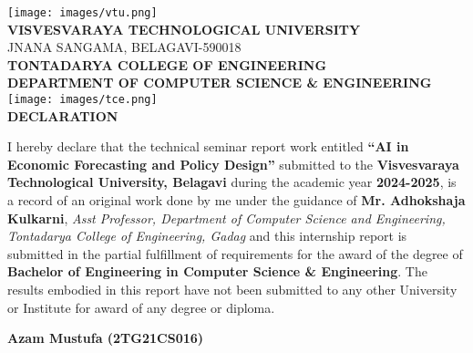 \begin{titlepage}
    \thispagestyle{empty}
    \centering

    \texttt{[image: images/vtu.png]}\\[0.3cm]

    {\LARGE\bfseries{VISVESVARAYA TECHNOLOGICAL UNIVERSITY}}\\[0.2cm]
    {\large{JNANA SANGAMA, BELAGAVI-590018}}\\[0.3cm]

    {\Large\bfseries{TONTADARYA COLLEGE OF ENGINEERING}}\\[0.15cm]
    {\large\bfseries{DEPARTMENT OF COMPUTER SCIENCE \& ENGINEERING}}\\[0.8cm]

    \texttt{[image: images/tce.png]}\\[0.8cm] %

    {\Large\bfseries{DECLARATION}}\\[0.8cm]

    \begin{flushleft}
        \setlength{\parindent}{0pt}
        \renewcommand{\baselinestretch}{1.3}\normalsize

        I hereby declare that the technical seminar report work entitled \textbf{{``AI in Economic Forecasting and Policy Design''}}
        submitted to the \textbf{Visvesvaraya Technological University, Belagavi} during the academic year \textbf{2024-2025},
        is a record of an original work done by me under the guidance of \textbf{Mr. Adhokshaja Kulkarni},
        \textit{Asst Professor, Department of Computer Science and Engineering, Tontadarya College of Engineering, Gadag}
        and this internship report is submitted in the partial fulfillment of requirements for the award of the degree of
        \textbf{Bachelor of Engineering in Computer Science \& Engineering}. The results embodied in this report have not
        been submitted to any other University or Institute for award of any degree or diploma.
    \end{flushleft}

    \vfill

    \begin{flushright}
        \textbf{Azam Mustufa (2TG21CS016)}
    \end{flushright}
\end{titlepage}
